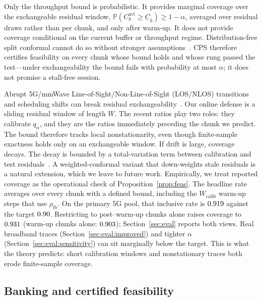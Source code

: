 Only the throughput bound is probabilistic.
It provides marginal coverage over the exchangeable residual window, \(\mathbb{P}(C^{\mathrm{act}}_k\ge\underline{C}_k)\ge 1-\alpha\), averaged over residual draws rather than per chunk, and only after warm-up.
It does not provide coverage conditional on the current buffer or throughput regime.
Distribution-free split conformal cannot do so without stronger assumptions~\cite{angelopoulos2023gentle}.
CPS therefore certifies feasibility on every chunk whose bound holds and whose rung passed the test---under exchangeability the bound fails with probability at most \(\alpha\); it does not promise a stall-free session.

Abrupt \mbox{5G/mmWave} Line-of-Sight/Non-Line-of-Sight (LOS/NLOS) transitions and scheduling shifts can break residual exchangeability~\cite{narayanan2021variegated}. Our online defense is a sliding residual window of length \(W\). The recent ratios play two roles: they calibrate \(q_{\alpha}\), and they are the ratios immediately preceding the chunk we predict. The bound therefore tracks local nonstationarity, even though finite-sample exactness holds only on an exchangeable window. If drift is large, coverage decays. The decay is bounded by a total-variation term between calibration and test residuals~\cite{barber2023beyond}. A weighted-conformal variant that down-weights stale residuals is a natural extension, which we leave to future work.
Empirically, we treat reported coverage as the operational check of Proposition~\ref{prop:feas}.
The headline rate averages over every chunk with a defined bound, including the \(W_{\mathrm{calib}}\) warm-up steps that use \(\rho_{\mathrm{fb}}\).
On the primary \mbox{5G} pool, that inclusive rate is \(0.919\) against the target \(0.90\).
Restricting to post--warm-up chunks alone raises coverage to \(0.931\) (warm-up chunks alone: \(0.903\)); Section~\ref{sec:eval} reports both views.
Real broadband traces (Section~\ref{sec:eval:improved}) and tighter \(\alpha\) (Section~\ref{sec:eval:sensitivity}) can sit marginally below the target.
This is what the theory predicts: short calibration windows and nonstationary traces both erode finite-sample coverage.

\subsection{Banking and certified feasibility}
\label{sec:method:shield}

